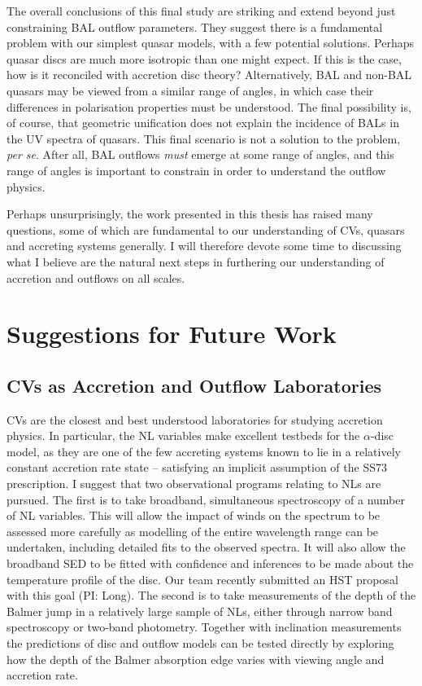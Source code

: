 The overall conclusions of this final study are striking and extend 
beyond just constraining BAL outflow parameters. 
They suggest there is a fundamental problem with our simplest quasar models, with 
a few potential solutions. Perhaps quasar discs are much 
more isotropic than one might expect. If this is the case, how is it
reconciled with accretion disc theory? Alternatively, BAL and
non-BAL quasars may be viewed from a similar range of angles, in 
which case their differences in polarisation properties must be 
understood. The final possibility is, of course, that geometric unification
does not explain the incidence of BALs in the UV spectra of quasars.
This final scenario is not a solution to the problem, {\sl per se}. After all, BAL
outflows {\em must} emerge at some range of angles, and this range of 
angles is important to constrain in order to understand the outflow physics.

Perhaps unsurprisingly, the work presented in this thesis has raised 
many questions, some of which are fundamental to our understanding of CVs, 
quasars and accreting systems generally. I
will therefore devote some time to discussing what I believe are the 
natural next steps in furthering our understanding of accretion
and outflows on all scales.

\section{Suggestions for Future Work}

\subsection{CVs as Accretion and Outflow Laboratories}
CVs are the closest and best understood laboratories for
studying accretion physics. In particular, the NL
variables make excellent testbeds for the $\alpha$-disc model,
as they are one of the few accreting systems known to
lie in a relatively constant accretion rate state -- satisfying 
an implicit assumption of the SS73 prescription. I suggest
that two observational programs relating to NLs are pursued.
The first is to take broadband, simultaneous spectroscopy of a number
of NL variables. This will allow the impact of winds on the spectrum
to be assessed more carefully as modelling of the entire wavelength
range can be undertaken, including detailed fits to the observed spectra.
It will also allow the broadband SED to be fitted with confidence
and inferences to be made about the temperature profile of the disc. 
Our team recently submitted an HST proposal with this goal (PI: Long).
The second is to take measurements of the depth of the Balmer jump
in a relatively large sample of NLs, either through narrow band spectroscopy
or two-band photometry. Together with inclination measurements the predictions
of disc and outflow models can be tested directly by exploring how the depth
of the Balmer absorption edge varies with viewing angle and accretion rate.

